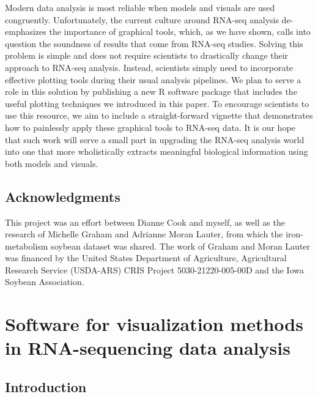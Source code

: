\documentclass[11pt,a4paper,oldfontcommands,openany]{memoir}
\numberwithin{equation}{section} %
\begin{document}
Modern data analysis is most reliable when models and visuals are used congruently. Unfortunately, the current culture around RNA-seq analysis de-emphasizes the importance of graphical tools, which, as we have shown, calls into question the soundness of results that come from RNA-seq studies. Solving this problem is simple and does not require scientists to drastically change their approach to RNA-seq analysis. Instead, scientists simply need to incorporate effective plotting tools during their usual analysis pipelines. We plan to serve a role in this solution by publishing a new \textsf{R} software package that includes the useful plotting techniques we introduced in this paper. To encourage scientists to use this resource, we aim to include a straight-forward vignette that demonstrates how to painlessly apply these graphical tools to RNA-seq data. It is our hope that such work will serve a small part in upgrading the RNA-seq analysis world into one that more wholistically extracts meaningful biological information using both models and visuals.

\section{Acknowledgments}

This project was an effort between Dianne Cook and myself, as well as the research of Michelle Graham and Adrianne Moran Lauter, from which the iron-metabolism soybean dataset was shared. The work of Graham and Moran Lauter was financed by the United States Department of Agriculture, Agricultural Research Service (USDA-ARS) CRIS Project 5030-21220-005-00D and the Iowa Soybean Association.



\chapter{Software for visualization methods in RNA-sequencing data analysis}
\label{sec:chapter3}

\section{Introduction}
\end{document}
